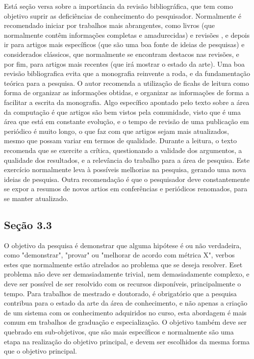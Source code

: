 \documentclass[
	12pt,				%
	openright,			%
	oneside,			%
	a4paper,			%
	chapter=TITLE,		%
	subsection=TITLE,	%
	english,			%
	brazilian,				%
	]{abntex2}
\begin{document}
Está seção versa sobre a importância da revisão bibliográfica, que tem como objetivo suprir as deficiências de conhecimento do pesquisador.
Normalmente é recomendado iniciar por trabalhos mais abrangentes, como livros (que normalmente contêm informações completas e amadurecidas) e revisões , e depois ir para artigos mais específicos  (que são uma boa fonte de ideias de pesquisas) e considerados clássicos, que normalmente se encontram destacos nas revisões, e por fim, para artigos mais recentes (que irá mostrar o estado da arte). Uma boa revisão bibliografica evita que a monografia reinvente a roda, e da fundamentação teórica para a pesquisa.
O autor recomenda a utilização de ficahs de leitura como forma de organizar as informações obtidas, e organizar as informações de forma a facilitar a escrita da monografia.
Algo específico apontado pelo texto sobre a área da computação é que artigos são bem vistos pela comunidade, visto que é uma área que está em constante evolução, e o tempo de revisão de uma publicação em periódico é muito longo, o que faz com que artigos sejam mais atualizados, mesmo que possam variar em termos de qualidade.
Durante a leitura, o texto recomenda que se exercite a crítica, questionando a validade dos argumentos, a qualidade dos resultados, e a relevância do trabalho para a área de pesquisa. Este exercício normalmente leva à possíveis melhorias na pesquisa, gerando uma nova ideias de pesquisa. Outra recomendação é que o pesquisador deve constantemente se expor a resumos de novos artios em conferências e periódicos renomados, para se manter atualizado.

\subsection*{Seção 3.3}

O objetivo da pesquisa é demonstrar que alguma hipótese é ou não verdadeira, como "demonstrar", "provar" ou "melhorar de acordo com métrica X", verbos estes que normalmente estão atrelados ao problema que se deseja resolver. Eset problema não deve ser demasiadamente trivial, nem demasiadamente complexo, e deve ser possível de ser resolvido com os recursos disponíveis, principalmente o tempo.
Para trabalhos de mestrado e doutorado, é obrigatório que a pesquisa contribua para o estado da arte da área de conhecimento, e não apenas a criação de um sistema com os conhecimento adquiridos no curso, esta abordagem é mais comum em trabalhos de graduação e especialização.
O objetivo também deve ser quebrado em sub-objetivos, que são mais específicos e normalmente são uma etapa na realização do objetivo principal, e devem ser escolhidos da mesma forma que o objetivo principal.
\end{document}
